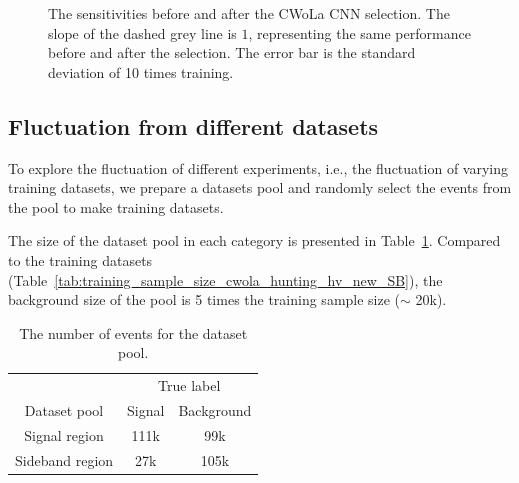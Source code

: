 \documentclass[12pt]{article}
\begin{document}
        \begin{figure}[htpb]
            \centering
            \caption{The sensitivities before and after the CWoLa CNN selection. The slope of the dashed grey line is $1$, representing the same performance before and after the selection. The error bar is the standard deviation of 10 times training.}
            \label{fig:sensitivity_improvement_pt_jet_aug_3_ZN}
        \end{figure}
    \subsection{Fluctuation from different datasets}%
    \label{sub:fluctuation_from_different_datasets}
        To explore the fluctuation of different experiments, i.e., the fluctuation of varying training datasets, we prepare a datasets pool and randomly select the events from the pool to make training datasets. 

        The size of the dataset pool in each category is presented in Table~\ref{tab:dataset_pool_sample_size}. Compared to the training datasets (Table~\ref{tab:training_sample_size_cwola_hunting_hv_new_SB}), the background size of the pool is 5 times the training sample size ($\sim$ 20k). 
        \begin{table}[htpb]
            \centering
            \caption{The number of events for the dataset pool.}
            \label{tab:dataset_pool_sample_size}
            \begin{tabular}{c|cc}
                                & \multicolumn{2}{c}{True label} \\
                Dataset pool    & Signal       & Background      \\ \hline
                Signal region   & 111k         & 99k             \\
                Sideband region & 27k          & 105k
            \end{tabular}
        \end{table}
\end{document}
